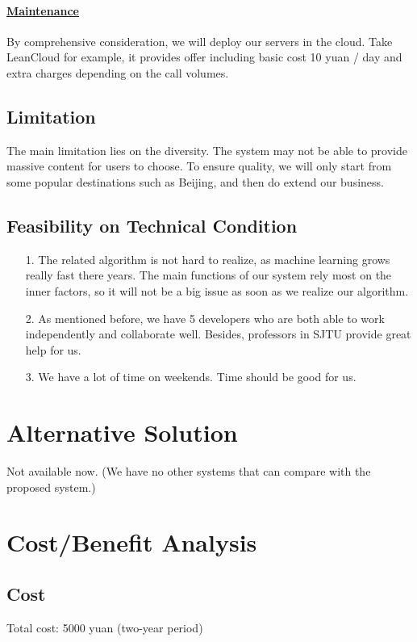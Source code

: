 \documentclass[10pt]{article}
\begin{document}
\paragraph{\underline{Maintenance}}
By comprehensive consideration, we will deploy our servers in the cloud. Take LeanCloud for example, it provides offer including basic cost 10 yuan / day and extra charges depending on the call volumes.

\subsection{Limitation}
The main limitation lies on the diversity. The system may not be able to provide massive content for users to choose. To ensure quality, we will only start from some popular destinations such as Beijing, and then do extend our business.

\subsection{Feasibility on Technical Condition}
\begin{itemize}
  \item[1.] The related algorithm is not hard to realize, as machine learning grows really fast there years. The main functions of our system rely most on the inner factors, so it will not be a big issue as soon as we realize our algorithm.
  \item[2.] As mentioned before, we have 5 developers who are both able to work independently and collaborate well. Besides, professors in SJTU provide great help for us.
  \item[3.] We have a lot of time on weekends. Time should be good for us. 
\end{itemize}

\section{Alternative Solution}
Not available now. (We have no other systems that can compare with the proposed system.)

\section{Cost/Benefit Analysis}
\subsection{Cost}
Total cost: 5000 yuan (two-year period)
\end{document}
